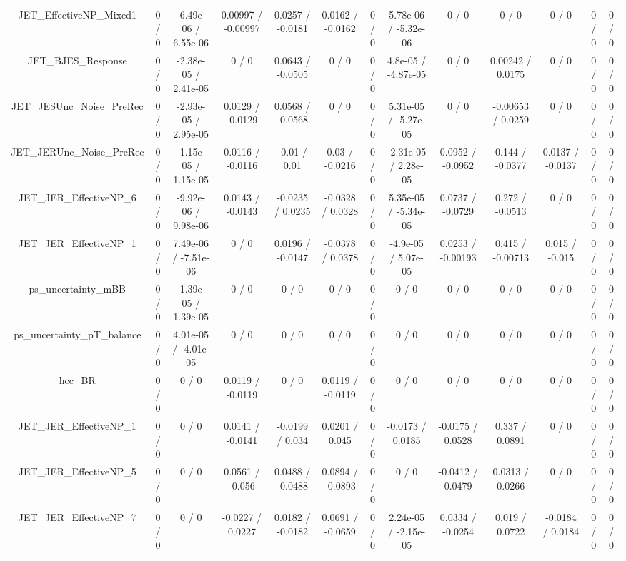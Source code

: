 \documentclass[10pt]{article}
\begin{document}
\begin{table}[htbp]
\begin{center}
\begin{tabular}{|c|c|c|c|c|c|c|c|c|c|c|c|c|}
  JET_EffectiveNP_Mixed1 & 0 / 0 & -6.49e-06 / 6.55e-06 & 0.00997 / -0.00997 & 0.0257 / -0.0181 & 0.0162 / -0.0162 & 0 / 0 & 5.78e-06 / -5.32e-06 & 0 / 0 & 0 / 0 & 0 / 0 & 0 / 0 & 0 / 0 \\ 
  JET_BJES_Response & 0 / 0 & -2.38e-05 / 2.41e-05 & 0 / 0 & 0.0643 / -0.0505 & 0 / 0 & 0 / 0 & 4.8e-05 / -4.87e-05 & 0 / 0 & 0.00242 / 0.0175 & 0 / 0 & 0 / 0 & 0 / 0 \\ 
  JET_JESUnc_Noise_PreRec & 0 / 0 & -2.93e-05 / 2.95e-05 & 0.0129 / -0.0129 & 0.0568 / -0.0568 & 0 / 0 & 0 / 0 & 5.31e-05 / -5.27e-05 & 0 / 0 & -0.00653 / 0.0259 & 0 / 0 & 0 / 0 & 0 / 0 \\ 
  JET_JERUnc_Noise_PreRec & 0 / 0 & -1.15e-05 / 1.15e-05 & 0.0116 / -0.0116 & -0.01 / 0.01 & 0.03 / -0.0216 & 0 / 0 & -2.31e-05 / 2.28e-05 & 0.0952 / -0.0952 & 0.144 / -0.0377 & 0.0137 / -0.0137 & 0 / 0 & 0 / 0 \\ 
  JET_JER_EffectiveNP_6 & 0 / 0 & -9.92e-06 / 9.98e-06 & 0.0143 / -0.0143 & -0.0235 / 0.0235 & -0.0328 / 0.0328 & 0 / 0 & 5.35e-05 / -5.34e-05 & 0.0737 / -0.0729 & 0.272 / -0.0513 & 0 / 0 & 0 / 0 & 0 / 0 \\ 
  JET_JER_EffectiveNP_1 & 0 / 0 & 7.49e-06 / -7.51e-06 & 0 / 0 & 0.0196 / -0.0147 & -0.0378 / 0.0378 & 0 / 0 & -4.9e-05 / 5.07e-05 & 0.0253 / -0.00193 & 0.415 / -0.00713 & 0.015 / -0.015 & 0 / 0 & 0 / 0 \\ 
  ps_uncertainty_mBB & 0 / 0 & -1.39e-05 / 1.39e-05 & 0 / 0 & 0 / 0 & 0 / 0 & 0 / 0 & 0 / 0 & 0 / 0 & 0 / 0 & 0 / 0 & 0 / 0 & 0 / 0 \\ 
  ps_uncertainty_pT_balance & 0 / 0 & 4.01e-05 / -4.01e-05 & 0 / 0 & 0 / 0 & 0 / 0 & 0 / 0 & 0 / 0 & 0 / 0 & 0 / 0 & 0 / 0 & 0 / 0 & 0 / 0 \\ 
  hcc_BR & 0 / 0 & 0 / 0 & 0.0119 / -0.0119 & 0 / 0 & 0.0119 / -0.0119 & 0 / 0 & 0 / 0 & 0 / 0 & 0 / 0 & 0 / 0 & 0 / 0 & 0 / 0 \\ 
  JET_JER_EffectiveNP_1 & 0 / 0 & 0 / 0 & 0.0141 / -0.0141 & -0.0199 / 0.034 & 0.0201 / 0.045 & 0 / 0 & -0.0173 / 0.0185 & -0.0175 / 0.0528 & 0.337 / 0.0891 & 0 / 0 & 0 / 0 & 0 / 0 \\ 
  JET_JER_EffectiveNP_5 & 0 / 0 & 0 / 0 & 0.0561 / -0.056 & 0.0488 / -0.0488 & 0.0894 / -0.0893 & 0 / 0 & 0 / 0 & -0.0412 / 0.0479 & 0.0313 / 0.0266 & 0 / 0 & 0 / 0 & 0 / 0 \\ 
  JET_JER_EffectiveNP_7 & 0 / 0 & 0 / 0 & -0.0227 / 0.0227 & 0.0182 / -0.0182 & 0.0691 / -0.0659 & 0 / 0 & 2.24e-05 / -2.15e-05 & 0.0334 / -0.0254 & 0.019 / 0.0722 & -0.0184 / 0.0184 & 0 / 0 & 0 / 0 \\ 

\end{tabular}
\end{center}
\end{table}
\end{document}
